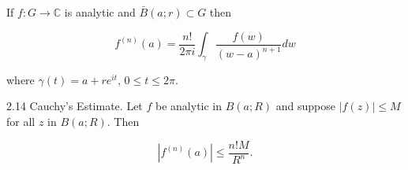 If $f: G \to \mathbb{C}$ is analytic and $\bar{B}(a; r) \subset G$ then

$$f^{(n)}(a) = \frac{n!}{2\pi i} \int_{\gamma} \frac{f(w)}{(w-a)^{n+1}} dw$$

where $\gamma(t) = a + re^{it}$, $0 \leq t \leq 2\pi$.

2.14 Cauchy’s Estimate. Let $f$ be analytic in $B(a; R)$ and suppose $|f(z)| \leq M$ for all $z$ in $B(a; R)$. Then

$$|f^{(n)}(a)| \leq \frac{n!M}{R^n}.$$